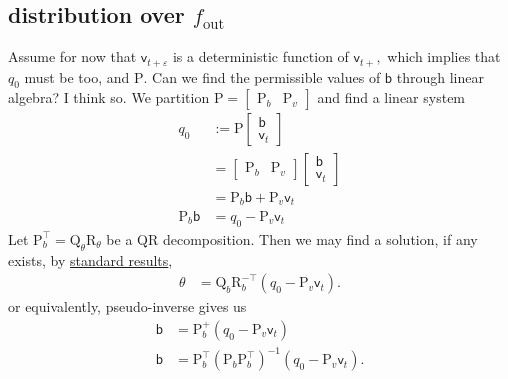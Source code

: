 \documentclass{article}
\newcommand{\mm}[1]{\mathrm{#1}}
\newcommand{\rv}[1]{\mathsf{#1}}
\newcommand{\lat}{\rv{b}}   %
\newcommand{\latst}{b}      %
\begin{document}
\subsection{distribution over $f_{\text{out}}$}
Assume for now that \(\rv{v}_{t+\varepsilon}\) is a deterministic function of \(\rv{v}_{t+},\) which implies that \(q_0\) must be too, and \(\mm{P}\).
Can we find the permissible values of \(\lat\) through  linear algebra?
I think so. We partition \(\mm{P}=\begin{bmatrix}
\mm{P}_{\latst} & \mm{P}_{v}\end{bmatrix}\) and find a linear system
\begin{align}
    q_0
    &:= \mm{P}\begin{bmatrix}
      \lat\\
      \rv{v}_{t}
    \end{bmatrix}\\
    &=\begin{bmatrix}
      \mm{P}_{\latst} &
      \mm{P}_{v}
    \end{bmatrix}\begin{bmatrix}
      \lat\\
      \rv{v}_{t}
    \end{bmatrix}\\
    &=
      \mm{P}_{\latst}\lat +
      \mm{P}_{v}\rv{v}_{t}\\
    \mm{P}_{\latst}\lat &= q_0 - \mm{P}_{v}\rv{v}_{t}
\end{align}
Let \(\mm{P}_{\latst}^\top=\mm{Q}_\theta\mm{R}_\theta\) be a QR decomposition.
Then we may find a solution, if any exists, by  \href{https://math.stackexchange.com/a/2753878/110462}{standard results},
\begin{align}
    \theta &= \mm{Q}_{\latst}\mm{R}_{\latst}^{-\top}(q_0 - \mm{P}_{v}\rv{v}_{t}).
\end{align}
or equivalently, pseudo-inverse gives us
\begin{align}
    \lat &= \mm{P}_{\latst}^{+} (q_0 - \mm{P}_{v}\rv{v}_{t})\\
    \lat &= \mm{P}_{\latst}^{\top} (\mm{P}_{\latst}\mm{P}_{\latst}^{\top})^{-1} (q_0 - \mm{P}_{v}\rv{v}_{t}).
\end{align}
\end{document}
